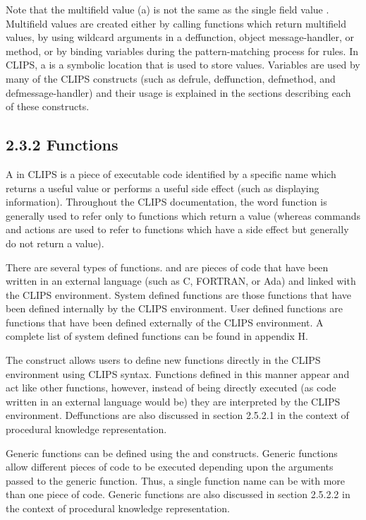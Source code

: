 \documentclass[letterpaper,10pt,english]{sphinxmanual}
\begin{document}
Note that the multifield value (a) is not the same as the single field
value . Multifield values are created either by calling functions
which return multifield values, by using wildcard arguments in a
deffunction, object message-handler, or method, or by binding variables
during the pattern-matching process for rules. In CLIPS, a 
is a symbolic location that is used to store values. Variables are used
by many of the CLIPS constructs (such as defrule, deffunction,
defmethod, and defmessage-handler) and their usage is explained in the
sections describing each of these constructs.


\subsection{2.3.2 Functions}
\label{\detokenize{overview:functions}}
A  in CLIPS is a piece of executable code identified by a
specific name which returns a useful value or performs a useful side
effect (such as displaying information). Throughout the CLIPS
documentation, the word function is generally used to refer only to
functions which return a value (whereas commands and actions are used to
refer to functions which have a side effect but generally do not return
a value).

There are several types of functions.  and
 are pieces of code that have been written
in an external language (such as C, FORTRAN, or Ada) and linked with the
CLIPS environment. System defined functions are those functions that
have been defined internally by the CLIPS environment. User defined
functions are functions that have been defined externally of the CLIPS
environment. A complete list of system defined functions can be found in
appendix H.

The  construct allows users to define new functions
directly in the CLIPS environment using CLIPS syntax. Functions defined
in this manner appear and act like other functions, however, instead of
being directly executed (as code written in an external language would
be) they are interpreted by the CLIPS environment. Deffunctions are also
discussed in section 2.5.2.1 in the context of procedural knowledge
representation.

Generic functions can be defined using the  and
 constructs. Generic functions allow different pieces of
code to be executed depending upon the arguments passed to the generic
function. Thus, a single function name can be  with more
than one piece of code. Generic functions are also discussed in section
2.5.2.2 in the context of procedural knowledge representation.
\end{document}
